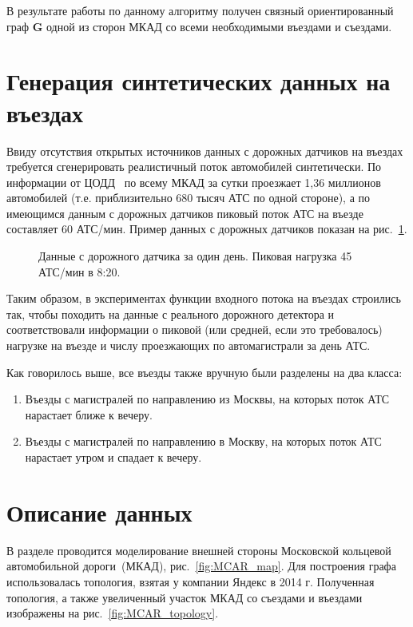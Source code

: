 В результате работы по данному алгоритму получен связный ориентированный граф \(\mathbf{G}\) одной из сторон МКАД со всеми необходимыми въездами и съездами.

\section{Генерация синтетических данных на въездах}
\label{sec:MCAR_data}
Ввиду отсутствия открытых источников данных с дорожных датчиков на въездах требуется сгенерировать реалистичный поток автомобилей синтетически.
По информации от ЦОДД~\cite{CODD_MKAD} по всему МКАД за сутки проезжает 1,36 миллионов автомобилей (т.е. приблизительно 680 тысяч АТС по одной стороне), а по имеющимся данным с дорожных датчиков пиковый поток АТС на въезде составляет 60 АТС/мин.
Пример данных с дорожных датчиков показан на рис.~\ref{fig:Detector_example}.
\begin{figure}[ht]
    \caption{Данные с дорожного датчика за один день. Пиковая нагрузка 45 АТС/мин в 8:20.}
    \label{fig:Detector_example}
\end{figure}

Таким образом, в экспериментах функции входного потока на въездах строились так, чтобы походить на данные с реального дорожного детектора и соответствовали информации о пиковой (или средней, если это требовалось) нагрузке на въезде и числу проезжающих по автомагистрали за день АТС.

Как говорилось выше, все въезды также вручную были разделены на два класса:
\begin{enumerate}
  \item Въезды с магистралей по направлению из Москвы, на которых поток АТС нарастает ближе к вечеру.
  \item Въезды с магистралей по направлению в Москву, на которых поток АТС нарастает утром и спадает к вечеру.
\end{enumerate}


\section{Описание данных}
\label{sec::data}
В разделе проводится моделирование внешней стороны Московской кольцевой автомобильной дороги~(МКАД), рис.~\ref{fig:MCAR_map}.
Для построения графа использовалась топология, взятая у компании Яндекс в 2014 г.
Полученная топология, а также увеличенный участок МКАД со съездами и въездами изображены на рис.~\ref{fig:MCAR_topology}.

